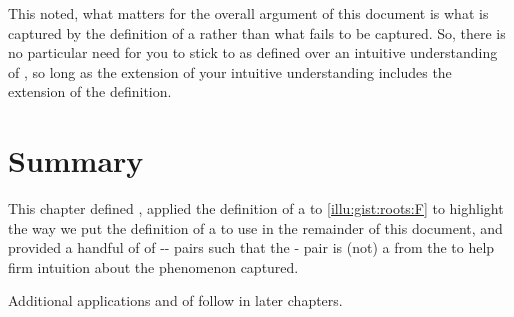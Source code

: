 \begin{note}
  This noted, what matters for the overall argument of this document is what is captured by the definition of a \fc{} rather than what fails to be captured.
  So, there is no particular need for you to stick to  as defined over an intuitive understanding of , so long as the extension of your intuitive understanding includes the extension of the definition.
\end{note}



\section*{Summary}


\begin{note}
  This chapter defined , applied the definition of a \fc{} to \autoref{illu:gist:roots:F} to highlight the way we put the definition of a \fc{} to use in the remainder of this document, and provided a handful of  of -- pairs such that the - pair is (not) a \fc{} from the \pool{} to help firm intuition about the phenomenon captured.

  Additional applications and  of  follow in later chapters.
\end{note}


